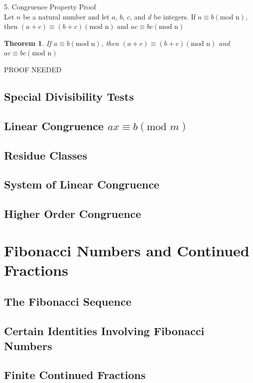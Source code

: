 \documentclass{book}
\newtheorem{theorem}{Theorem}[section]
\theoremstyle{definition}
\theoremstyle{remark}
\begin{document}
5. Congruence Property Proof \\
Let $n$ be a natural number and let $a$, $b$, $c$, and $d$ be integers. If $a \equiv b (\text{mod n})$, then $(a + c) \equiv (b + c) (\text{mod n})$ and $ac \equiv bc (\text{mod n})$ \\

\begin{tcolorbox}
	\begin{theorem}
		If $a \equiv b (\text{mod n})$, then $(a + c) \equiv (b + c) (\text{mod n})$ and $ac \equiv bc (\text{mod n})$
	\end{theorem}
\end{tcolorbox}

PROOF NEEDED


\newpage
\subsection{Special Divisibility Tests}
\subsection{Linear Congruence $ax \equiv b (\text{mod }m)$}
\subsection{Residue Classes}
\subsection{System of Linear Congruence}
\subsection{Higher Order Congruence}

\newpage
\section{Fibonacci Numbers and Continued Fractions}
\subsection{The Fibonacci Sequence}
\subsection{Certain Identities Involving Fibonacci Numbers}
\subsection{Finite Continued Fractions}
\end{document}
